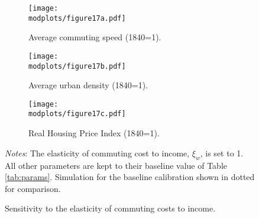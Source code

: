 \documentclass[./20250130-paper.tex]{subfiles}
\begin{document}




\begin{figure}[p]
	\begin{adjustbox}{center}
		\begin{subfigure}{\pthree\textwidth}
			\texttt{[image: \\modplots/figure17a.pdf]}
			\caption{Average commuting speed (1840=1).\label{fig:model-sensi-commute-speed}}
		\end{subfigure}
		\begin{subfigure}{\pthree\textwidth}
			\texttt{[image: \\modplots/figure17b.pdf]}
			\caption{Average urban density (1840=1).\label{fig:model-sensi-commute-avgd}}
		\end{subfigure}
		\begin{subfigure}{\pthree\textwidth}
			\texttt{[image: \\modplots/figure17c.pdf]}
			\caption{Real Housing Price Index (1840=1).\label{fig:model-sensi-commute-HPI}}		
		\end{subfigure}
	\end{adjustbox}
	\caption{Sensitivity to the elasticity of commuting costs to income.\label{fig:model-sensi-commute}}
	{\footnotesize \textit{Notes}: The elasticity of commuting cost to income, $\xi_w$, is set to 1. All other parameters are kept to their baseline value of Table \ref{tab:params}. Simulation for the baseline calibration shown in dotted for comparison.}\end{figure}
\end{document}
